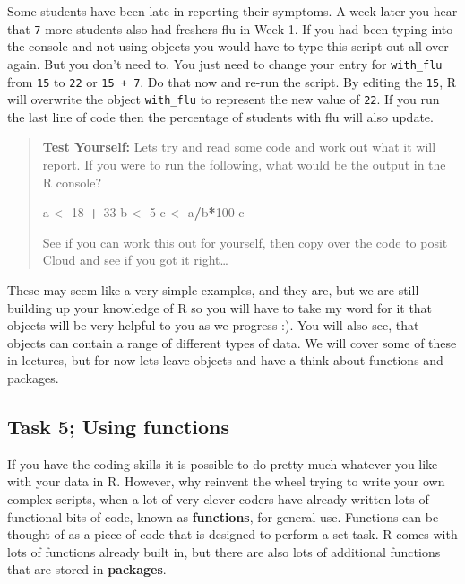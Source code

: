 \documentclass[
]{book}
\newenvironment{Shaded}{\begin{snugshade}}{\end{snugshade}}
\newcommand{\DecValTok}[1]{\textcolor[rgb]{0.00,0.00,0.81}{#1}}
\newcommand{\NormalTok}[1]{#1}
\newcommand{\OtherTok}[1]{\textcolor[rgb]{0.56,0.35,0.01}{#1}}
\newcommand{\SpecialCharTok}[1]{\textcolor[rgb]{0.81,0.36,0.00}{\textbf{#1}}}
\begin{document}
Some students have been late in reporting their symptoms. A week later you hear that \texttt{7} more students also had freshers flu in Week 1. If you had been typing into the console and not using objects you would have to type this script out all over again. But you don't need to. You just need to change your entry for \texttt{with\_flu} from \texttt{15} to \texttt{22} or \texttt{15\ +\ 7}. Do that now and re-run the script. By editing the \texttt{15}, R will overwrite the object \texttt{with\_flu} to represent the new value of \texttt{22}. If you run the last line of code then the percentage of students with flu will also update.

\begin{quote}
\textbf{Test Yourself:}
Lets try and read some code and work out what it will report. If you were to run the following, what would be the output in the R console?

\begin{Shaded}
\begin{Highlighting}[]
\NormalTok{a }\OtherTok{\textless{}{-}} \DecValTok{18} \SpecialCharTok{+} \DecValTok{33}
\NormalTok{b }\OtherTok{\textless{}{-}} \DecValTok{5}
\NormalTok{c }\OtherTok{\textless{}{-}}\NormalTok{ a}\SpecialCharTok{/}\NormalTok{b}\SpecialCharTok{*}\DecValTok{100}
\NormalTok{c}
\end{Highlighting}
\end{Shaded}

See if you can work this out for yourself, then copy over the code to posit Cloud and see if you got it right\ldots{}
\end{quote}

These may seem like a very simple examples, and they are, but we are still building up your knowledge of R so you will have to take my word for it that objects will be very helpful to you as we progress :). You will also see, that objects can contain a range of different types of data. We will cover some of these in lectures, but for now lets leave objects and have a think about functions and packages.

\subsection{Task 5; Using functions}\label{task-5-using-functions}

If you have the coding skills it is possible to do pretty much whatever you like with your data in R. However, why reinvent the wheel trying to write your own complex scripts, when a lot of very clever coders have already written lots of functional bits of code, known as \textbf{functions}, for general use. Functions can be thought of as a piece of code that is designed to perform a set task. R comes with lots of functions already built in, but there are also lots of additional functions that are stored in \textbf{packages}.
\end{document}
